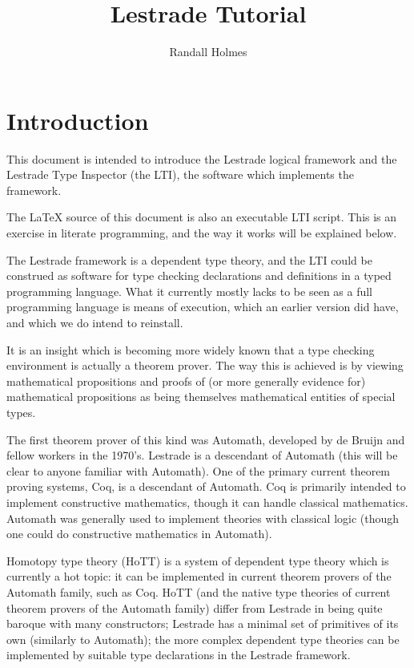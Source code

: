 \documentclass[12pt]{article}
\title{Lestrade Tutorial}
\author{Randall Holmes}
\begin{document}
\maketitle

\tableofcontents

\newpage

\section{Introduction}

This document is intended to introduce the Lestrade logical framework and the Lestrade Type Inspector (the LTI), the software which implements the framework.

The LaTeX source of this document is also an executable LTI script.  This is an exercise in literate programming, and the way
it works will be explained below.

The Lestrade framework is a dependent type theory, and the LTI could be construed as software for type checking declarations and definitions in a typed programming language.  What it currently mostly lacks to be seen as a full programming language
is means of execution, which an earlier version did have, and which we do intend to reinstall.

It is an insight which is becoming more widely known that a type checking environment is actually a theorem prover.  The way this is achieved is by viewing mathematical propositions and proofs of (or more generally evidence for) mathematical propositions as being themselves mathematical entities of special types. 

The first theorem prover of this kind was Automath, developed by de Bruijn and fellow workers in the 1970's.    Lestrade is a descendant of Automath (this will be clear to anyone familiar with Automath).   One of the primary current theorem proving systems, Coq, is a descendant of Automath.  Coq is primarily intended to implement constructive mathematics, though it can handle classical mathematics.  Automath was generally used to implement theories with classical logic (though one could do constructive mathematics in Automath).

Homotopy type theory (HoTT) is a system of dependent type theory which is currently a hot topic:  it can be implemented in current theorem provers of the Automath family, such as Coq.  HoTT (and the native type theories of current theorem provers of the Automath family) differ from Lestrade in being quite baroque with many constructors;  Lestrade has a minimal set of primitives of its own (similarly to Automath);  the more complex dependent type theories can be implemented by suitable type declarations in the Lestrade framework.
\end{document}
